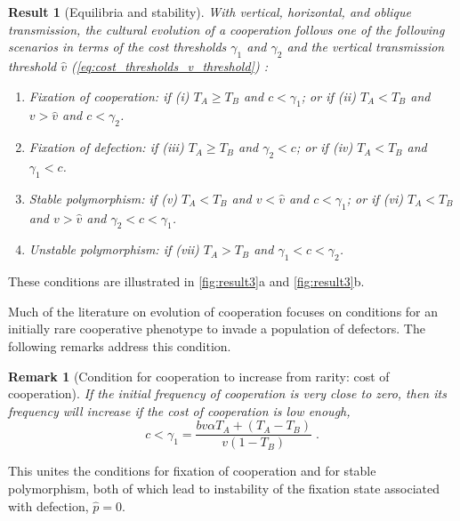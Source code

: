 \documentclass[12pt]{extarticle}
\newtheorem{remark}{Remark}
\newtheorem{result}{Result}
\begin{document}
\begin{result}[Equilibria and stability] \label{result:vert_obli_hori}
With vertical, horizontal, and oblique transmission, the cultural evolution of a cooperation follows one of the following scenarios in terms of the cost thresholds $\gamma_1$ and $\gamma_2$ and the vertical transmission threshold $\hat v$ (\autoref{eq:cost_thresholds_v_threshold}) :

\begin{enumerate}
\item \emph{Fixation of cooperation}: 
	if \emph{(i)} $T_A \ge T_B$ and $c < \gamma_1$; or 
	if \emph{(ii)} $T_A < T_B$ and $v>\hat v$ and $c < \gamma_2$.
\item \emph{Fixation of defection}: 
    if \emph{(iii)} $T_A \ge T_B$ and $\gamma_2 < c$; or 
	if \emph{(iv)} $T_A < T_B$ and $\gamma_1 < c$.
\item \emph{Stable polymorphism}: 
    if \emph{(v)} $T_A < T_B$ and $v<\hat{v}$ and $c < \gamma_1$; or 
    if \emph{(vi)} $T_A < T_B$ and $v>\hat{v}$ and $\gamma_2 < c < \gamma_1$.
\item \emph{Unstable polymorphism}:
    if \emph{(vii)} $T_A > T_B$ and $\gamma_1 < c < \gamma_2$.
\end{enumerate}

\end{result}
These conditions are illustrated in \autoref{fig:result3}a and \autoref{fig:result3}b.

Much of the literature on evolution of cooperation focuses on conditions for  an initially rare cooperative phenotype to invade a population of defectors.
The following remarks address this condition.
\\

\begin{remark}[Condition for cooperation to increase from rarity: cost of cooperation]
\label{remark:rarity}
If the initial frequency of cooperation is very close to zero, then its frequency will increase if the cost of cooperation is low enough,
\begin{equation} \label{eq:unequal_transmission_from_rarity_general_case}
c < \gamma_1 = \frac{b v \alpha T_A + (T_A - T_B)}{v(1-T_B)} \;.
\end{equation} 
\end{remark}

This unites the conditions for fixation of cooperation and for stable polymorphism, both of which lead to instability of the fixation state associated with defection, $\hat{p}=0$.
\end{document}
